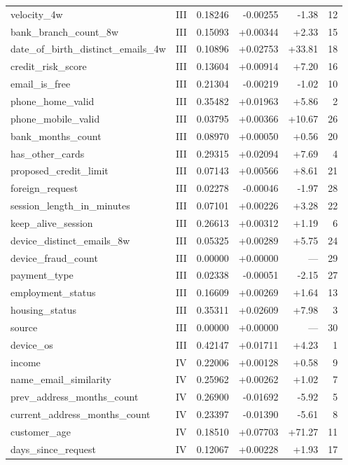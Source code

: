 \begin{longtable}{@{}llrrrr@{}}
velocity\_4w & III & 0.18246 & -0.00255 & -1.38 & 12 \\
bank\_branch\_count\_8w & III & 0.15093 & +0.00344 & +2.33 & 15 \\
date\_of\_birth\_distinct\_emails\_4w & III & 0.10896 & +0.02753 & +33.81 & 18 \\
credit\_risk\_score & III & 0.13604 & +0.00914 & +7.20 & 16 \\
email\_is\_free & III & 0.21304 & -0.00219 & -1.02 & 10 \\
phone\_home\_valid & III & 0.35482 & +0.01963 & +5.86 & 2 \\
phone\_mobile\_valid & III & 0.03795 & +0.00366 & +10.67 & 26 \\
bank\_months\_count & III & 0.08970 & +0.00050 & +0.56 & 20 \\
has\_other\_cards & III & 0.29315 & +0.02094 & +7.69 & 4 \\
proposed\_credit\_limit & III & 0.07143 & +0.00566 & +8.61 & 21 \\
foreign\_request & III & 0.02278 & -0.00046 & -1.97 & 28 \\
session\_length\_in\_minutes & III & 0.07101 & +0.00226 & +3.28 & 22 \\
keep\_alive\_session & III & 0.26613 & +0.00312 & +1.19 & 6 \\
device\_distinct\_emails\_8w & III & 0.05325 & +0.00289 & +5.75 & 24 \\
device\_fraud\_count & III & 0.00000 & +0.00000 & --- & 29 \\
payment\_type & III & 0.02338 & -0.00051 & -2.15 & 27 \\
employment\_status & III & 0.16609 & +0.00269 & +1.64 & 13 \\
housing\_status & III & 0.35311 & +0.02609 & +7.98 & 3 \\
source & III & 0.00000 & +0.00000 & --- & 30 \\
device\_os & III & 0.42147 & +0.01711 & +4.23 & 1 \\
income & IV & 0.22006 & +0.00128 & +0.58 & 9 \\
name\_email\_similarity & IV & 0.25962 & +0.00262 & +1.02 & 7 \\
prev\_address\_months\_count & IV & 0.26900 & -0.01692 & -5.92 & 5 \\
current\_address\_months\_count & IV & 0.23397 & -0.01390 & -5.61 & 8 \\
customer\_age & IV & 0.18510 & +0.07703 & +71.27 & 11 \\
days\_since\_request & IV & 0.12067 & +0.00228 & +1.93 & 17 \\

\end{longtable}
